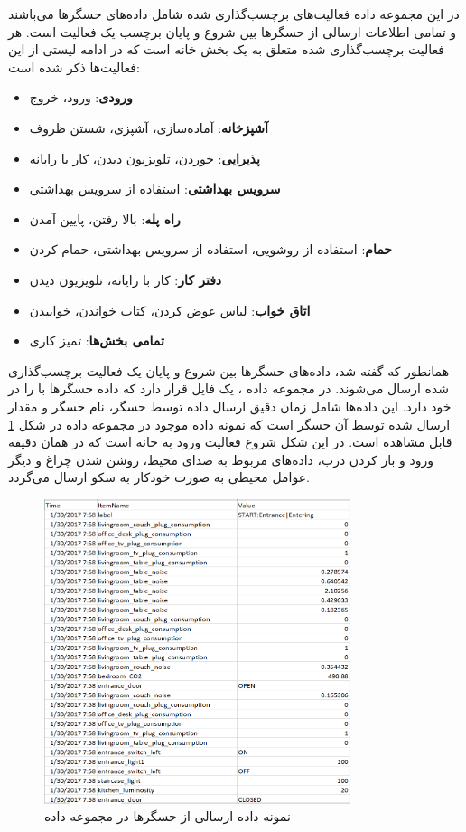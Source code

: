 در این مجموعه داده فعالیت‌های برچسب‌گذاری شده شامل داده‌های حسگرها می‌باشند و تمامی اطلاعات ارسالی از حسگرها بین شروع و پایان برچسب یک فعالیت است. هر فعالیت برچسب‌گذاری شده متعلق به یک بخش خانه است که در ادامه لیستی از این فعالیت‌ها ذکر شده است:

\begin{itemize}
\item \textbf{ورودی}: ورود، خروج
\item \textbf{آشپزخانه}: آماده‌سازی، آشپزی، شستن ظروف
\item \textbf{پذیرایی}: خوردن، تلویزیون دیدن، کار با رایانه
\item \textbf{سرویس بهداشتی}: استفاده از سرویس بهداشتی
\item \textbf{راه پله}: بالا رفتن، پایین آمدن
\item \textbf{حمام}: استفاده از روشویی، استفاده از سرویس بهداشتی، حمام کردن
\item \textbf{دفتر کار}: کار با رایانه، تلویزیون دیدن
\item \textbf{اتاق خواب}: لباس عوض کردن، کتاب خواندن، خوابیدن
\item \textbf{تمامی بخش‌ها}: تمیز کاری
\end{itemize}

همانطور که گفته شد، داده‌های حسگرها بین شروع و پایان یک فعالیت برچسب‌گذاری شده ارسال می‌شوند. در مجموعه داده ، یک فایل  قرار دارد که داده حسگرها با را در خود دارد. این داده‌ها شامل زمان دقیق ارسال داده توسط حسگر، نام حسگر و مقدار ارسال شده توسط آن حسگر است که نمونه داده‌ موجود در مجموعه داده در شکل \ref{fig:fO4H3} قابل مشاهده است. در این شکل شروع فعالیت ورود به خانه است که در همان دقیقه ورود و باز کردن درب، داده‌های مربوط به صدای محیط، روشن شدن چراغ و دیگر عوامل محیطی به صورت خودکار به سکو ارسال می‌گردد.

\begin{figure}[H]
\centerline{\includegraphics[width=0.8\textwidth]{figs/fO4H3.png}}
\caption{نمونه داده ارسالی از حسگرها در مجموعه داده }
\label{fig:fO4H3}
\end{figure}

